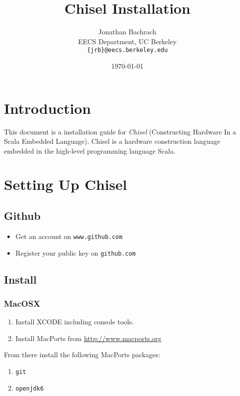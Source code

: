 \documentclass[twocolumn, 10pt]{article}
\title{Chisel Installation}
\author{Jonathan Bachrach \\
EECS Department, UC Berkeley\\
{\tt  \{jrb\}@eecs.berkeley.edu}
}
\date{\today}
\begin{document}
\maketitle{}

\section{Introduction}

This document is a installation guide for {\em Chisel} (Constructing
Hardware In a Scala Embedded Language).  Chisel is a hardware
construction language embedded in the high-level programming language
Scala.  

\section{Setting Up Chisel}

\subsection{Github}

\begin{itemize}
\item Get an account on \verb|www.github.com|
\item Register your public key on \verb|github.com|
\end{itemize}

\subsection{Install}

\subsubsection{MacOSX}

\begin{enumerate}
\item Install XCODE including console tools.
\item Install MacPorts from \url{http://www.macports.org}
\end{enumerate}

\noindent
From there install the following MacPorts packages:

\begin{enumerate}
\item \verb+git+
\item \verb+openjdk6+
\end{enumerate}
\end{document}
